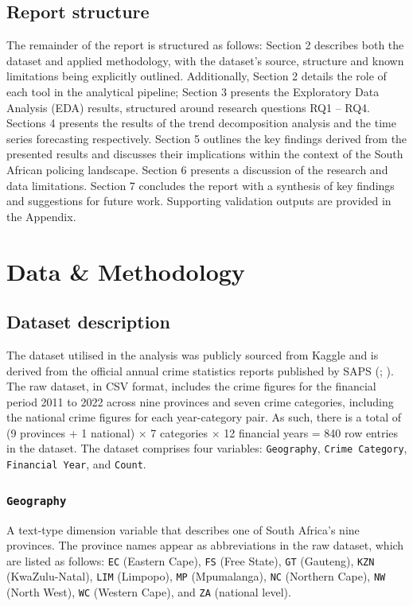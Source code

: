 \documentclass[titlepage, 12pt, oneside]{article}
\numberwithin{equation}{section}
\begin{document}
	
	\subsection{Report structure}
	The remainder of the report is structured as follows: Section 2 describes both the dataset and applied methodology, with the dataset's source, structure and known limitations being explicitly outlined. Additionally, Section 2 details the role of each tool in the analytical pipeline; Section 3 presents the Exploratory Data Analysis (EDA) results, structured around research questions RQ1 -- RQ4. Sections 4 presents the results of the trend decomposition analysis and the time series forecasting respectively. Section 5 outlines the key findings derived from the presented results and discusses their implications within the context of the South African policing landscape. Section 6 presents a discussion of the research and data limitations. Section 7 concludes the report with a synthesis of key findings and suggestions for future work. Supporting validation outputs are provided in the Appendix. 
	
	\newpage
	\section{Data \& Methodology}
	
	\subsection{Dataset description}  \label{dataset_descrip}
	The dataset utilised in the analysis was publicly sourced from Kaggle and is derived from the official annual crime statistics reports published by SAPS (\cite{kaggle}; \cite{saps2023}). The raw dataset, in CSV format, includes the crime figures for the financial period 2011 to 2022 across nine provinces and seven crime categories, including the national crime figures for each year-category pair. As such, there is a total of (9 provinces + 1 national) $\times$ 7 categories $\times$ 12 financial years = 840 row entries in the dataset. The dataset comprises four variables: \texttt{Geography}, \texttt{Crime Category}, \texttt{Financial Year}, and \texttt{Count}. 
	
	\subsubsection*{\texttt{Geography}} 
	A text-type dimension variable that describes one of South Africa's nine provinces. The province names appear as abbreviations in the raw dataset, which are listed as follows: \texttt{EC} (Eastern Cape), \texttt{FS} (Free State), \texttt{GT} (Gauteng), \texttt{KZN} (KwaZulu-Natal), \texttt{LIM} (Limpopo), \texttt{MP} (Mpumalanga), \texttt{NC} (Northern Cape), \texttt{NW} (North West), \texttt{WC} (Western Cape), and \texttt{ZA} (national level).
\end{document}
